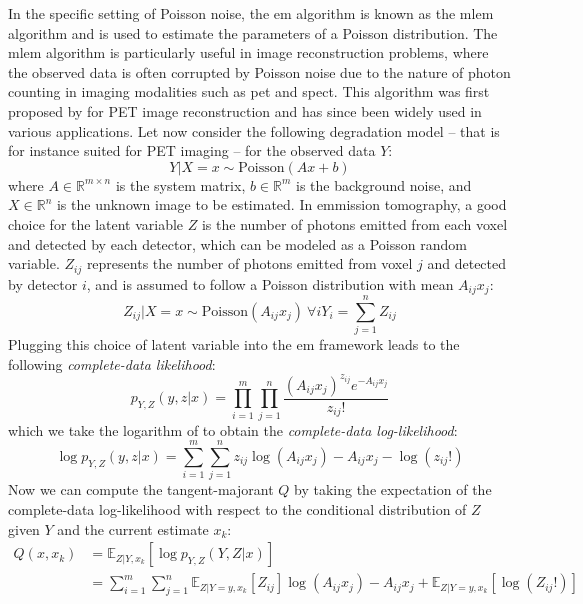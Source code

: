 In the specific setting of Poisson noise, the \acrshort{em} algorithm is known as the \acrfull{mlem} algorithm and is used to estimate the parameters of a Poisson distribution.
The \acrshort{mlem} algorithm is particularly useful in image reconstruction problems, where the observed data is often corrupted by Poisson noise due to the nature of photon counting in imaging modalities such as \acrfull{pet} and \acrfull{spect}.
This algorithm was first proposed by \cite{Shepp1982} for PET image reconstruction and has since been widely used in various applications.
Let now consider the following degradation model -- that is for instance suited for PET imaging -- for the observed data $Y$:
\begin{equation}
    Y | X=x \sim \text{Poisson}(A x + b)
\end{equation}
where $A \in \mathbb{R}^{m \times n}$ is the system matrix, $b \in \mathbb{R}^m$ is the background noise, and $X \in \mathbb{R}^n$ is the unknown image to be estimated.
In emmission tomography, a good choice for the latent variable $Z$ is the number of photons emitted from each voxel and detected by each detector, which can be modeled as a Poisson random variable.
$Z_{ij}$ represents the number of photons emitted from voxel $j$ and detected by detector $i$, and is assumed to follow a Poisson distribution with mean $A_{ij} x_j$:
\begin{equation}
    Z_{ij} | X=x \sim \text{Poisson}(A_{ij} x_j) \
    \forall i Y_i = \sum_{j=1}^{n} Z_{ij}
\end{equation}
Plugging this choice of latent variable into the \acrshort{em} framework leads to the following \textit{complete-data likelihood}:
\begin{equation}
    p_{Y, Z}(y, z|x) = \prod_{i=1}^{m} \prod_{j=1}^{n} \frac{(A_{ij} x_j)^{z_{ij}} e^{-A_{ij} x_j}}{z_{ij}!}
\end{equation}
which we take the logarithm of to obtain the \textit{complete-data log-likelihood}:
\begin{equation}
    \log p_{Y, Z}(y, z|x) = \sum_{i=1}^{m} \sum_{j=1}^{n} z_{ij} \log(A_{ij} x_j) - A_{ij} x_j - \log(z_{ij}!)
\end{equation}
Now we can compute the tangent-majorant $Q$ by taking the expectation of the complete-data log-likelihood with respect to the conditional distribution of $Z$ given $Y$ and the current estimate $x_k$:
\begin{align}
    Q(x, x_k) &= \mathbb{E}_{Z|Y, x_k}[\log p_{Y, Z}(Y, Z|x)] \\
    &= \sum_{i=1}^{m} \sum_{j=1}^{n} \mathbb{E}_{Z|Y=y, x_k}[Z_{ij}] \log(A_{ij} x_j) - A_{ij} x_j + \mathbb{E}_{Z|Y=y, x_k}[\log(Z_{ij}!)]
\end{align}
